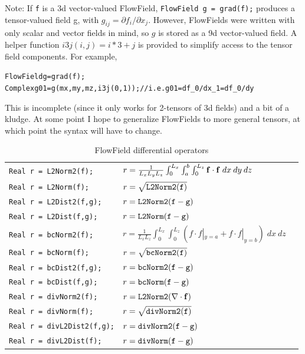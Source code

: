 \documentclass{article}[12pt]
\begin{document}
Note: If {\tt f} is a 3d vector-valued FlowField, {\tt FlowField g = grad(f);}
produces a tensor-valued field g, with $g_{ij} = \partial f_i / \partial x_j$.
However, FlowFields were written with only scalar and vector fields in mind,
so $g$ is stored as a 9d vector-valued field. A helper function
$i3j(i,j) = i*3+j$ is provided to simplify access to the tensor field
components. For example,
\begin{alltt}
  FlowField g = grad(f);
  Complex g01 = g(mx,my,mz,i3j(0,1)); // i.e. g01 = df_0/dx_1 = df_0/dy
\end{alltt}
This is incomplete (since it only works for 2-tensors of 3d fields) and a bit
of a kludge. At some point I hope to generalize FlowFields to more general
tensors, at which point the syntax will have to change.


\begin{table}
\centering
\begin{tabular}{lll}
{\tt Real r = L2Norm2(f);}  &   $ r = \frac{1}{L_x L_y L_z} \int_0^{L_x} \int_a^b \int_0^{L_z} {\bf f} \cdot {\bf f} \;dx\:dy\:dz$\\
{\tt Real r = L2Norm(f);} &     $ r = \sqrt{\tt L2Norm2(f)}$ \\
{\tt Real r = L2Dist2(f,g);} &  $ r = {\tt L2Norm2(f-g)}$ \\
{\tt Real r = L2Dist(f,g);} &   $ r = {\tt L2Norm(f-g)}$ \\

{\tt Real r = bcNorm2(f);} & 	$ r = \frac{1}{L_x L_z} \int_0^{L_x} \int_0^{L_z} \left( f \cdot f |_{y=a} +  f \cdot f |_{y=b} \right) \;dx\:dz$\\
{\tt Real r = bcNorm(f);} & 	$ r = \sqrt{\tt bcNorm2(f)}$ \\
{\tt Real r = bcDist2(f,g);} & 	$ r = {\tt bcNorm2(f-g)}$ \\
{\tt Real r = bcDist(f,g);} & 	$ r = {\tt bcNorm(f-g)}$ \\

{\tt Real r = divNorm2(f);} & 	$ r = {\tt L2Norm2}(\nabla \cdot {\bf f})$ \\
{\tt Real r = divNorm(f);} & 	$ r = \sqrt{\tt divNorm2(f)}$ \\
{\tt Real r = divL2Dist2(f,g);} & $ r = {\tt divNorm2(f-g)}$ \\
{\tt Real r = divL2Dist(f);} & 	$ r = {\tt divNorm(f-g)}$ \\
\end{tabular}
\caption{FlowField differential operators}
\end{table}
\end{document}
